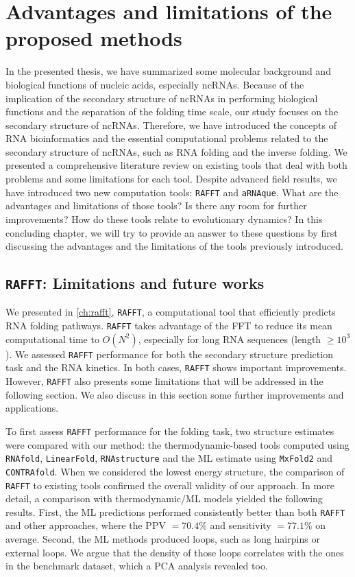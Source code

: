 \chapter{Advantages and limitations of the proposed methods}\label{ch:limitations}
In the presented thesis, we have summarized some molecular background and biological functions of nucleic acids, especially \acp{ncRNA}. Because of the implication of the secondary structure of \acp{ncRNA} in performing biological functions and the separation of the folding time scale, our study focuses on the secondary structure of \acp{ncRNA}. Therefore, we have introduced the concepts of \ac{RNA} bioinformatics and the essential computational problems related to the secondary structure of \acp{ncRNA}, such as \ac{RNA} folding and the inverse folding. We presented a comprehensive literature review on existing tools that deal with both problems and some limitations for each tool. Despite advanced field results, we have introduced two new computation tools: \texttt{RAFFT} and \texttt{aRNAque}. What are the advantages and limitations of those tools? Is there any room for further improvements? How do these tools relate to evolutionary dynamics? In this concluding chapter, we will try to provide an answer to these questions by first discussing the advantages and the limitations of the tools previously introduced. 

\section{\texttt{RAFFT}: Limitations and future works }

We presented in \autoref{ch:rafft}, \texttt{RAFFT}, a computational tool that efficiently predicts \ac{RNA} folding pathways. \texttt{RAFFT} takes advantage of the \ac{FFT} to reduce its mean computational time to $O(N^2)$, especially for long \ac{RNA} sequences (length $\geq 10^3$). We assessed \texttt{RAFFT} performance for both the secondary structure prediction task and the \ac{RNA} kinetics. In both cases, \texttt{RAFFT} shows important improvements. However, \texttt{RAFFT} also presents some limitations that will be addressed in the following section. We also discuss in this section some further improvements and applications.
 
To first assess \texttt{RAFFT} performance for the folding task, two structure estimates were compared with our method: the thermodynamic-based tools computed using \texttt{RNAfold}, \texttt{LinearFold}, \texttt{RNAstructure} and the \ac{ML} estimate using \texttt{MxFold2} and \texttt{CONTRAfold}. When we considered the lowest energy structure, the comparison of \texttt{RAFFT} to existing tools confirmed the overall validity of our approach. In more detail, a comparison with thermodynamic/\ac{ML} models yielded the following results. First, the \ac{ML} predictions performed consistently better than both \texttt{RAFFT} and other approaches, where the \ac{PPV} $=70.4\%$ and sensitivity $=77.1\%$ on average. Second, the \ac{ML} methods produced loops, such as long hairpins or external loops. We argue that the density of those loops correlates with the ones in the benchmark dataset, which a \ac{PCA} analysis revealed too.


